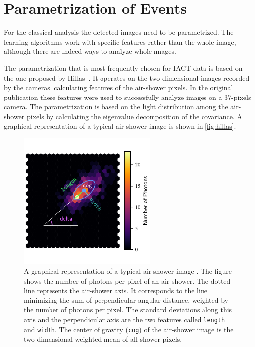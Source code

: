 \section{Parametrization of Events}
\label{sec:params}
%
For the classical analysis the detected images need to be parametrized. The
learning algorithms work with specific features rather than the whole image,
although there are indeed ways to analyze whole images.

The parametrization that is most frequently chosen for IACT data is based on
the one proposed by Hillas~\cite{Hillas}. It operates on the two-dimensional
images recorded by the cameras, calculating features of the air-shower pixels.
In the original publication these features were used to successfully analyze
images on a 37-pixels camera. The parametrization is based on the light
distribution among the air-shower pixels by calculating the eigenvalue
decomposition of the covariance. A graphical representation of a typical
air-shower image is shown in \autoref{fig:hillas}.
%
\begin{figure}
  \centering%
  \includegraphics[width=0.6\textwidth]{Plots/hillas.pdf}%
  \caption{A graphical representation of a typical air-shower image \cite{maxhillas}. The figure shows the number of photons per pixel of an air-shower. The dotted
  line represents the air-shower axis. It corresponds to the line minimizing the
  sum of perpendicular angular distance, weighted by the number of photons per
  pixel. The standard deviations along this axis and the perpendicular axis are
  the two features called \texttt{length} and \texttt{width}. The center of
  gravity (\texttt{cog}) of the air-shower image is the two-dimensional weighted
  mean of all shower pixels.}%
  \label{fig:hillas}%
\end{figure}
